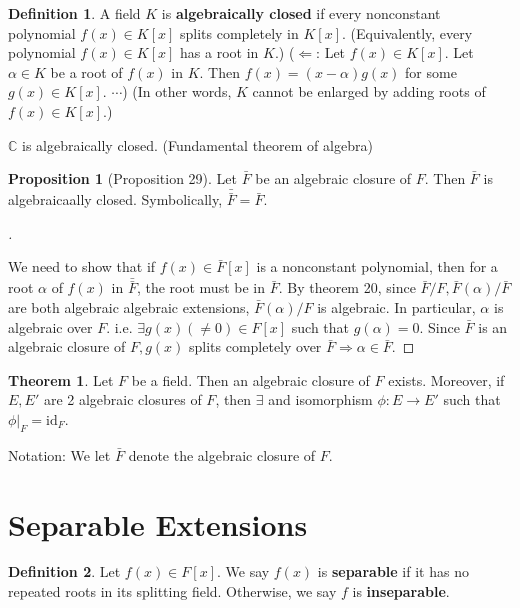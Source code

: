 \documentclass{article}
\theoremstyle{definition}
\newtheorem{thm}{Theorem}
\newtheorem{dfn}{Definition}
\newtheorem{prop}{Proposition}
\newenvironment{proofs}[1][\proofname]{%
  \begin{proof}[#1]$ $\par\nobreak\ignorespaces
}{%
  \end{proof}
}
\begin{document}
\begin{dfn}
	A field $K$ is \textbf{algebraically closed} if every nonconstant polynomial $f(x) \in K[x]$ splits completely in $K[x]$. 
	(Equivalently, every polynomial $f(x) \in K[x]$ has a root in $K$.)
	($\Leftarrow$: Let $f(x) \in K[x]$. 
	Let $\alpha \in K$ be a root of $f(x)$ in $K$.
	Then $f(x) = (x - \alpha) g(x)$ for some $g(x) \in K[x]$. $\cdots$)
	(In other words, $K$ cannot be enlarged by adding roots of $f(x) \in K[x]$.)
\end{dfn}

\begin{ex}
	$\mathbb{C}$ is algebraically closed.
	(Fundamental theorem of algebra)
\end{ex}

\begin{prop}[Proposition 29]
	Let $\bar{F}$ be an algebraic closure of $F$. 
	Then $\bar{F}$ is algebraicaally closed.
	Symbolically, $\bar{\bar{F}} = \bar{F}$.
\end{prop}

\begin{proofs}
	We need to show that if $f(x) \in \bar{F}[x]$ is a nonconstant polynomial, then for a root $\alpha$ of $f(x)$ in $\bar{\bar{F}}$, the root must be in $\bar{F}$. 
	By theorem 20, since $\bar{F}/F, \bar{F}(\alpha)/\bar{F}$ are both algebraic algebraic extensions, $\bar{F}(\alpha)/F$ is algebraic.
	In particular, $\alpha$ is algebraic over $F$.
	i.e. $\exists g(x) ( \neq 0)\in F[x]$ such that $g(\alpha) = 0$.
	Since $\bar{F}$ is an algebraic closure of $F, g(x)$ splits completely over $\bar{F} \Rightarrow \alpha \in \bar{F}$.
\end{proofs}

\begin{thm}
	Let $F$ be a field.
	Then an algebraic closure of $F$ exists.
	Moreover, if $E, E'$ are 2 algebraic closures of $F$, then $\exists$ and isomorphism $\phi: E \to E'$ such that $\phi|_F = \text{id}_F$.
\end{thm}

Notation: We let $\bar{F}$ denote the algebraic closure of $F$.

\clearpage
\section{Separable Extensions}

\begin{dfn}
	Let $f(x) \in F[x]$.
	We say $f(x)$ is \textbf{separable} if it has no repeated roots in its splitting field.
	Otherwise, we say $f$ is \textbf{inseparable}.
\end{dfn}
\end{document}
